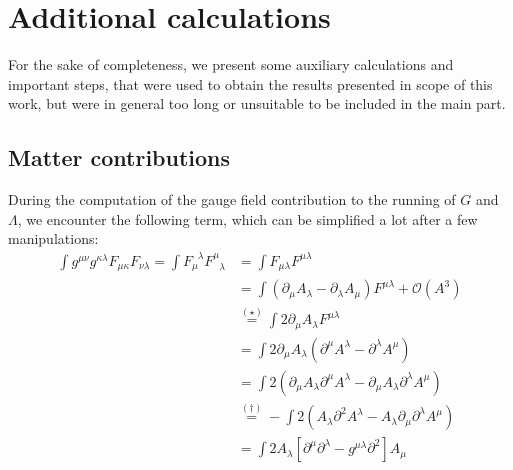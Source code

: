\chapter{Additional calculations}\label{chap:AppB}
For the sake of completeness, we present some auxiliary calculations and important steps, that were used to obtain the results presented in scope of this work, but were in general too long or unsuitable to be included in the main part.
\section{Matter contributions}
During the computation of the gauge field contribution to the running of $G$ and $\Lambda$, we encounter the following term, which can be simplified a lot after a few manipulations:
\begin{align}\label{eqn:FF2} 
\int g^{\mu\nu}g^{\kappa\lambda} F_{\mu\kappa}F_{\nu\lambda} = \int F_{\mu}^{\phantom{\mu}\lambda}F_{\phantom{\mu}\lambda}^{\mu}	&= \int  F_{\mu\lambda}F^{\mu\lambda} \nonumber	\\
&= \int \left(\partial_{\mu}A_{\lambda} - \partial_{\lambda}A_{\mu}\right)F^{\mu\lambda} + \mathcal{O}\left(A^3\right)\nonumber \\
&\overset{(\star)}{=} \int 2\partial_{\mu}A_{\lambda} F^{\mu\lambda}\nonumber  \\
&=  \int 2\partial_{\mu}A_{\lambda}\left(\partial^{\mu}A^{\lambda} - \partial^{\lambda}A^{\mu}\right) \\
&= \int 2\left(\partial_{\mu}A_{\lambda}\partial^{\mu}A^{\lambda} - \partial_{\mu}A_{\lambda}\partial^{\lambda}A^{\mu}\right) \nonumber\\
&\overset{(\dagger)}{=} -\int 2\left( A_{\lambda}\partial^2A^{\lambda} - A_{\lambda}\partial_{\mu}\partial^{\lambda}A^{\mu}\right) \nonumber\\
&= \int 2A_{\lambda}\left[\partial^{\mu}\partial^{\lambda} - g^{\mu\lambda}\partial^2\right]A_{\mu}\nonumber 
\end{align}

